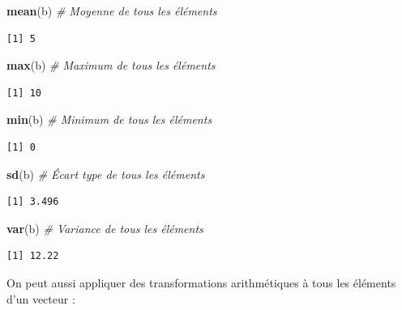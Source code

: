 \documentclass[12pt,]{book}
\newenvironment{Shaded}{\begin{snugshade}}{\end{snugshade}}
\newcommand{\CommentTok}[1]{\textcolor[rgb]{0.56,0.35,0.01}{\textit{#1}}}
\newcommand{\KeywordTok}[1]{\textcolor[rgb]{0.13,0.29,0.53}{\textbf{#1}}}
\newcommand{\NormalTok}[1]{#1}
\begin{document}
\begin{Shaded}
\begin{Highlighting}[]
\KeywordTok{mean}\NormalTok{(b)     }\CommentTok{# Moyenne de tous les éléments}
\end{Highlighting}
\end{Shaded}

\begin{verbatim}
[1] 5
\end{verbatim}

\begin{Shaded}
\begin{Highlighting}[]
\KeywordTok{max}\NormalTok{(b)      }\CommentTok{# Maximum de tous les éléments}
\end{Highlighting}
\end{Shaded}

\begin{verbatim}
[1] 10
\end{verbatim}

\begin{Shaded}
\begin{Highlighting}[]
\KeywordTok{min}\NormalTok{(b)      }\CommentTok{# Minimum de tous les éléments}
\end{Highlighting}
\end{Shaded}

\begin{verbatim}
[1] 0
\end{verbatim}

\begin{Shaded}
\begin{Highlighting}[]
\KeywordTok{sd}\NormalTok{(b)       }\CommentTok{# Écart type de tous les éléments}
\end{Highlighting}
\end{Shaded}

\begin{verbatim}
[1] 3.496
\end{verbatim}

\begin{Shaded}
\begin{Highlighting}[]
\KeywordTok{var}\NormalTok{(b)      }\CommentTok{# Variance de tous les éléments}
\end{Highlighting}
\end{Shaded}

\begin{verbatim}
[1] 12.22
\end{verbatim}

On peut aussi appliquer des transformations arithmétiques à tous les éléments d'un vecteur :
\end{document}
